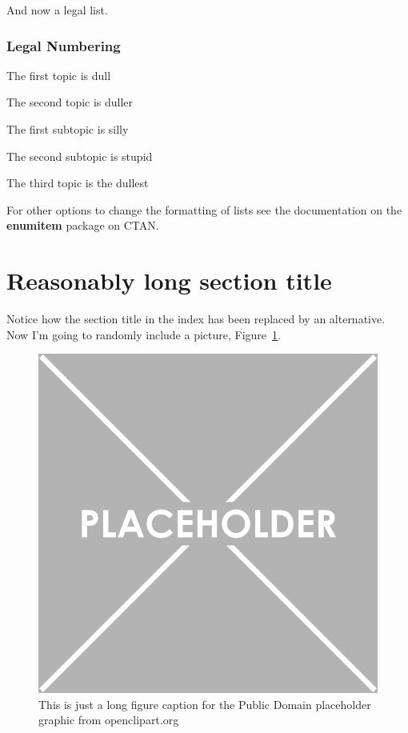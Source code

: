 And now a legal list.

\subsubsection{Legal Numbering}


\begin{legal}
\item The first topic is dull
\item The second topic is duller
\begin{legal}
\item The first subtopic is silly
\item The second subtopic is stupid
\end{legal}
\item The third topic is the dullest
\end{legal}

For other options to change the formatting of lists see the documentation on the \textbf{enumitem} package on CTAN.

\section[Short title]{Reasonably long section title}

Notice how the section title in the index has been replaced by an alternative. Now I'm going to randomly include a picture, Figure~\ref{fig:placeholder}.

\begin{figure}[htbp!] 
\centering    
\includegraphics[width=1.0\textwidth]{Placeholder}
\caption[Placeholder]{This is just a long figure caption for the Public Domain placeholder graphic from openclipart.org}
\label{fig:placeholder}
\end{figure}

